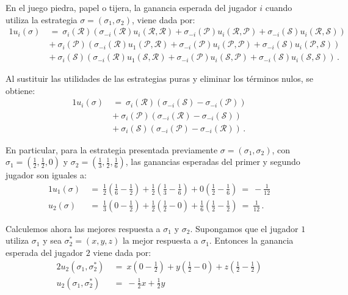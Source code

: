 En el juego piedra, papel o tijera, la ganancia esperada del jugador $i$ cuando utiliza la estrategia $\sigma = (\sigma_1, \sigma_2)$, viene dada por:
\begin{alignat}{1}
	u_i(\sigma)\ &=\ \sigma_i(\mathcal{R}) \left( \sigma_{-i}(\mathcal{R}) u_i(\mathcal{R}, \mathcal{R}) + \sigma_{-i}(\mathcal{P}) u_i(\mathcal{R}, \mathcal{P})+ \sigma_{-i}(\mathcal{S}) u_i(\mathcal{R}, \mathcal{S}) \right) \\ \nonumber
    &+\ \sigma_i(\mathcal{P}) \left(\sigma_{-i}(\mathcal{R}) u_1(\mathcal{P}, \mathcal{R}) + \sigma_{-i}(\mathcal{P}) u_i(\mathcal{P}, \mathcal{P})+ \sigma_{-i}(\mathcal{S}) u_i(\mathcal{P}, \mathcal{S})\right) \\ \nonumber
	&+\ \sigma_i(\mathcal{S}) \left(  \sigma_{-i}(\mathcal{R})  u_1(\mathcal{S}, \mathcal{R}) + \sigma_{-i}(\mathcal{P}) u_i(\mathcal{S}, \mathcal{P})+ \sigma_{-i}(\mathcal{S}) u_i(\mathcal{S}, \mathcal{S})\right)\,.
\end{alignat}

Al sustituir las utilidades de las estrategias puras y eliminar los términos nulos, se obtiene:
\begin{alignat}{1}
	u_i(\sigma)\
	&=\ \sigma_i(\mathcal{R}) \left(\sigma_{-i}(\mathcal{S}) - \sigma_{-i}(\mathcal{P}) \right) \\ \nonumber
    &+\ \sigma_i(\mathcal{P}) \left(\sigma_{-i}(\mathcal{R}) - \sigma_{-i}(\mathcal{S}) \right) \\ \nonumber
	&+\ \sigma_i(\mathcal{S}) \left(\sigma_{-i}(\mathcal{P}) - \sigma_{-i}(\mathcal{R}) \right)\,.
\end{alignat}

En particular, para la estrategia presentada previamente $\sigma = (\sigma_1, \sigma_2)$, con $\sigma_1 = \left( \frac{1}{2}, \frac{1}{2}, 0 \right)$ y $\sigma_2 = \left(\frac{1}{3}, \frac{1}{2}, \frac{1}{6} \right)$, las ganancias esperadas del primer y segundo jugador son iguales a:
\begin{alignat}{1}
    u_1(\sigma)\ &=\ \frac{1}{2} \left(\frac{1}{6} - \frac{1}{2}\right) + \frac{1}{2} \left( \frac{1}{3} -\frac{1}{6} \right) + 0 \left( \frac{1}{2} - \frac{1}{6} \right)\ =\ -\frac{1}{12} \\
    u_2(\sigma)\ &=\ \frac{1}{3}\left(0 -\frac{1}{2} \right) + \frac{1}{2} \left( \frac{1}{2} - 0 \right) + \frac{1}{6} \left( \frac{1}{2} - \frac{1}{2} \right)\ =\ \frac{1}{12}\,.
\end{alignat}

Calculemos ahora las mejores respuesta a $\sigma_1$ y $\sigma_2$. Supongamos que el jugador $1$ utiliza $\sigma_1$ y sea $\sigma^*_2 = (x, y, z)$ la mejor respuesta a $\sigma_1$. Entonces la ganancia esperada del jugador $2$ viene dada por:
\begin{alignat}{2}
u_2(\sigma_1, \sigma^*_2)\ &=\ x\left(0 -\frac{1}{2}\right) + y\left(\frac{1}{2} - 0\right) + z\left(\frac{1}{2} - \frac{1}{2}\right) \\
u_2(\sigma_1, \sigma^*_2)\ &=\ -\frac{1}{2}x + \frac{1}{2}y
\end{alignat}

